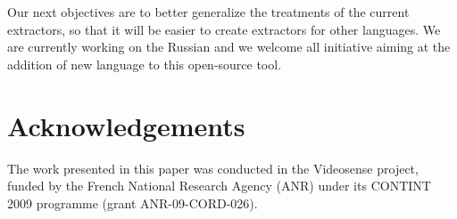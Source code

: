 \documentclass[10pt, a4paper]{article}
\begin{document}
Our next objectives are to better generalize the treatments of the current extractors, so that it will be easier to create extractors for other languages. We are currently working on the Russian and we welcome all initiative aiming at the addition of new language to this open-source tool.

\section{Acknowledgements}

The work presented in this paper was conducted in the Videosense project, funded by the French National Research Agency (ANR) under its CONTINT 2009 programme (grant ANR-09-CORD-026).


\end{document}
